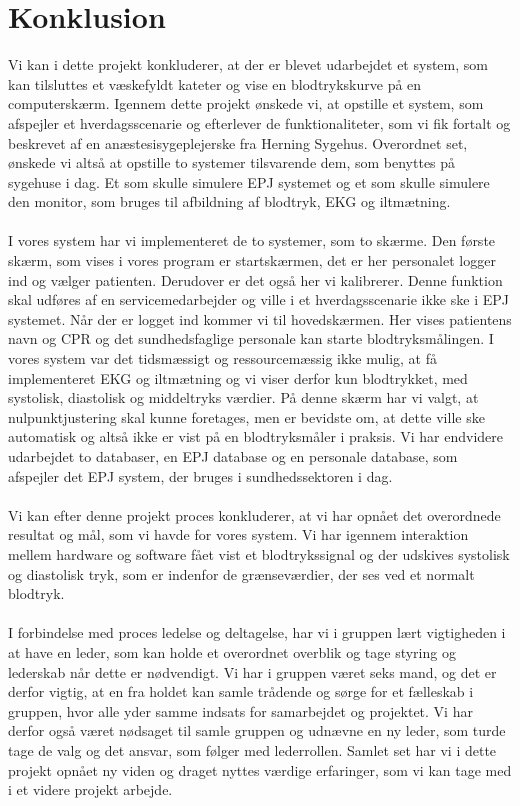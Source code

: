 \chapter{Konklusion}
Vi kan i dette projekt konkluderer, at der er blevet udarbejdet et system, som kan tilsluttes et væskefyldt kateter og vise en blodtrykskurve på en computerskærm. Igennem dette projekt ønskede vi, at opstille et system, som afspejler et hverdagsscenarie og efterlever de funktionaliteter, som vi fik fortalt og beskrevet af en anæstesisygeplejerske fra Herning Sygehus. Overordnet set, ønskede vi altså at opstille to systemer tilsvarende dem, som benyttes på sygehuse i dag. Et som skulle simulere EPJ systemet og et som skulle simulere den monitor, som bruges til afbildning af blodtryk, EKG og iltmætning. \\
\\
I vores system har vi implementeret de to systemer, som to skærme. Den første skærm, som vises i vores program er startskærmen, det er her personalet logger ind og vælger patienten. Derudover er det også her vi kalibrerer. Denne funktion skal udføres af en servicemedarbejder og ville i et hverdagsscenarie ikke ske i EPJ systemet. Når der er logget ind kommer vi til hovedskærmen. Her vises patientens navn og CPR og det sundhedsfaglige personale kan starte blodtryksmålingen. I vores system var det tidsmæssigt og ressourcemæssig ikke mulig, at få implementeret EKG og iltmætning og vi viser derfor kun blodtrykket, med systolisk, diastolisk og middeltryks værdier. På denne skærm har vi valgt, at nulpunktjustering skal kunne foretages, men er bevidste om, at dette ville ske automatisk og altså ikke er vist på en blodtryksmåler i praksis.  Vi har endvidere udarbejdet to databaser, en EPJ database og en personale database, som afspejler det EPJ system, der bruges i sundhedssektoren i dag. \\
\\
Vi kan efter denne projekt proces konkluderer, at vi har opnået det overordnede resultat og mål, som vi havde for vores system. Vi har igennem interaktion mellem hardware og software fået vist et blodtrykssignal og der udskives systolisk og diastolisk tryk, som er indenfor de grænseværdier, der ses ved et normalt blodtryk. \\
\\
I forbindelse med proces ledelse og deltagelse, har vi i gruppen lært vigtigheden i at have en leder, som kan holde et overordnet overblik og tage styring og lederskab når dette er nødvendigt. Vi har i gruppen været seks mand, og det er derfor vigtig, at en fra holdet kan samle trådende og sørge for et fælleskab i gruppen, hvor alle yder samme indsats for samarbejdet og projektet. Vi har derfor også været nødsaget til samle gruppen og udnævne en ny leder, som turde tage de valg og det ansvar, som følger med lederrollen. Samlet set har vi i dette projekt opnået ny viden og draget nyttes værdige erfaringer, som vi kan tage med i et videre projekt arbejde. 
